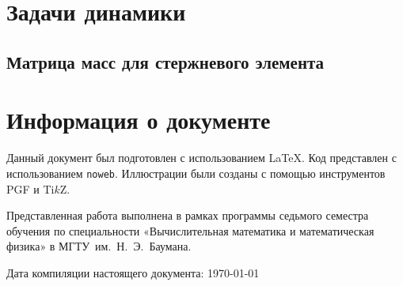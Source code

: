 \documentclass[10pt]{article}
\numberwithin{equation}{section}
\newcommand{\program}[1]{{\tt #1}}
\begin{document}
\section{Задачи динамики}

\subsection{Матрица масс для стержневого элемента}

\clearpage
\appendix
\section{Информация о документе}

Данный документ был подготовлен с использованием \LaTeX{}. Код
представлен с использованием \program{noweb}. Иллюстрации были созданы
с помощью инструментов PGF и Ti$k$Z.

Представленная работа выполнена в рамках программы седьмого семестра
обучения по специальности «Вычислительная математика и математическая
физика» в МГТУ им. Н. Э. Баумана.

Дата компиляции настоящего документа: \today



\end{document}
